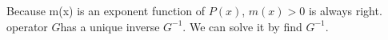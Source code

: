 \documentclass[a4paper]{article}
\begin{document}
Because m(x) is an exponent function of $P (x)$, $m (x) > 0$ is always right.
operator $G$has a unique inverse $G^{- 1}$. We can solve it by find $G^{- 1}$.
\\
\\%
%
%
%
%
%
%
%
%
%
%
%
\end{document}
